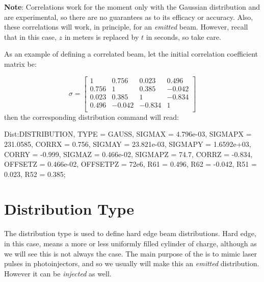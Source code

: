 \textbf{Note}: Correlations work for the moment only with the Gaussian distribution and are experimental, so there are
no guarantees as to its efficacy or accuracy. Also, these correlations will work, in principle, for an \emph{emitted} beam.
However, recall that in this case, $z$ in meters is replaced by $t$ in seconds, so take care.

As an example of defining a correlated beam, let the initial correlation coefficient matrix be:

\begin{equation*}
\sigma= \left[
\begin{array}{cccc}
1      &0.756  &0.023    &0.496\\
0.756  &1      &0.385    &-0.042\\
0.023  &0.385  &1        &-0.834\\
0.496  &-0.042 &-0.834   &1\\
\end{array}
\right]
\end{equation*}
then the corresponding distribution command will read:

\begin{example}
Dist:DISTRIBUTION, TYPE = GAUSS,
                   SIGMAX = 4.796e-03,
                   SIGMAPX = 231.0585,
                   CORRX = 0.756,
                   SIGMAY = 23.821e-03,
                   SIGMAPY = 1.6592e+03,
                   CORRY = -0.999,
                   SIGMAZ = 0.466e-02,
                   SIGMAPZ = 74.7,
                   CORRZ = -0.834,
                   OFFSETZ = 0.466e-02,
                   OFFSETPZ = 72e6,
                   R61 = 0.496,
                   R62 = -0.042,
                   R51 = 0.023,
                   R52 = 0.385;
\end{example}

\section{ Distribution Type}
\label{sec:flattopdisttype}
\FloatBarrier

The  distribution type is used to define hard edge beam distributions. Hard edge, in this case, means
a more or less uniformly filled cylinder of charge, although as we will see this is not always the case. The main purpose
of the  is to mimic laser pulses in photoinjectors, and so we usually will make this an \emph{emitted}
distribution. However it can be \emph{injected} as well.

